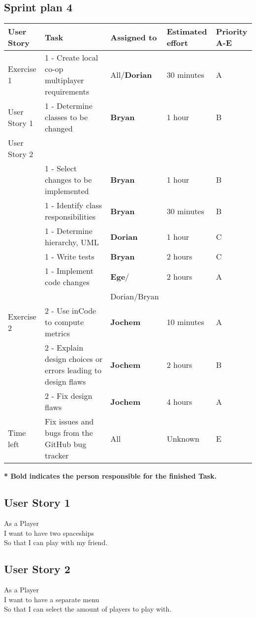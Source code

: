 \documentclass[10pt]{article}
\begin{document}
\begin{center}

\section*{Sprint plan 4}

    \hspace*{-3cm}\begin{tabular}{ | p{2cm} | p{9cm} | p{2.1cm} | p{2cm} | p{2cm} |}
    \hline
    User Story & Task & Assigned to & Estimated effort & Priority A-E \\ \hline
    Exercise 1 & 1 - Create local co-op multiplayer requirements & All/\textbf{Dorian} & 30 minutes & A\\ 
    User Story 1 & 1 - Determine classes to be changed & \textbf{Bryan} & 1 hour & B\\ 
    User Story 2 & & & &\\ 
    & 1 - Select changes to be implemented & \textbf{Bryan} & 1 hour & B\\ 
    & 1 - Identify class responsibilities & \textbf{Bryan} & 30 minutes & B\\ 
    & 1 - Determine hierarchy, UML & \textbf{Dorian} & 1 hour & C\\ 
    & 1 - Write tests & \textbf{Bryan}  & 2 hours & C\\
    & 1 - Implement code changes & \textbf{Ege}/ & 2 hours & A\\ 
     & & Dorian/Bryan &  & \\ \hline
    Exercise 2  & 2 - Use inCode to compute metrics & \textbf{Jochem} & 10 minutes & A\\ 
    & 2 - Explain design choices or errors leading to design flaws & \textbf{Jochem} & 2 hours & B\\  
    & 2 - Fix design flaws & \textbf{Jochem} & 4 hours & A\\ \hline           
    Time left & Fix issues and bugs from the GitHub bug tracker & All & Unknown & E\\ \hline     
    \end{tabular}
    
    \textbf{* Bold indicates the person responsible for the finished Task. } 
\end{center}

\subsection*{User Story 1}
As a Player\\ 
\indent I want to have two spaceships\\
So that I can play with my friend.

\subsection*{User Story 2}
As a Player\\ 
\indent I want to have a separate menu\\
So that I can select the amount of players to play with.
\end{document}
